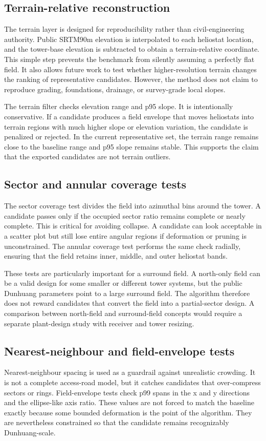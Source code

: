 \documentclass[final,3p,times]{elsarticle}
\begin{document}
\subsection{Terrain-relative reconstruction}
The terrain layer is designed for reproducibility rather than civil-engineering authority. Public SRTM90m elevation is interpolated to each heliostat location, and the tower-base elevation is subtracted to obtain a terrain-relative coordinate. This simple step prevents the benchmark from silently assuming a perfectly flat field. It also allows future work to test whether higher-resolution terrain changes the ranking of representative candidates. However, the method does not claim to reproduce grading, foundations, drainage, or survey-grade local slopes.

The terrain filter checks elevation range and p95 slope. It is intentionally conservative. If a candidate produces a field envelope that moves heliostats into terrain regions with much higher slope or elevation variation, the candidate is penalized or rejected. In the current representative set, the terrain range remains close to the baseline range and p95 slope remains stable. This supports the claim that the exported candidates are not terrain outliers.

\subsection{Sector and annular coverage tests}
The sector coverage test divides the field into azimuthal bins around the tower. A candidate passes only if the occupied sector ratio remains complete or nearly complete. This is critical for avoiding collapse. A candidate can look acceptable in a scatter plot but still lose entire angular regions if deformation or pruning is unconstrained. The annular coverage test performs the same check radially, ensuring that the field retains inner, middle, and outer heliostat bands.

These tests are particularly important for a surround field. A north-only field can be a valid design for some smaller or different tower systems, but the public Dunhuang parameters point to a large surround field. The algorithm therefore does not reward candidates that convert the field into a partial-sector design. A comparison between north-field and surround-field concepts would require a separate plant-design study with receiver and tower resizing.

\subsection{Nearest-neighbour and field-envelope tests}
Nearest-neighbour spacing is used as a guardrail against unrealistic crowding. It is not a complete access-road model, but it catches candidates that over-compress sectors or rings. Field-envelope tests check p99 spans in the x and y directions and the ellipse-like axis ratio. These values are not forced to match the baseline exactly because some bounded deformation is the point of the algorithm. They are nevertheless constrained so that the candidate remains recognizably Dunhuang-scale.
\end{document}

